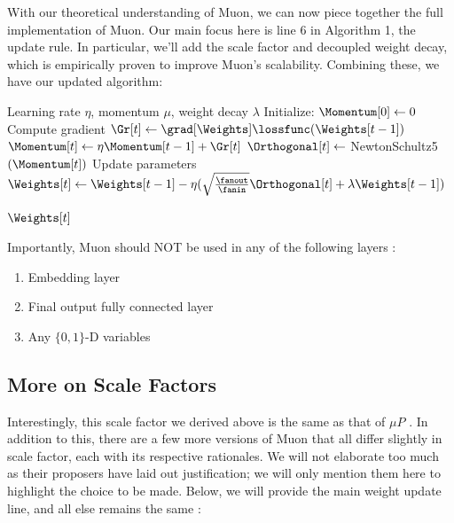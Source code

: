 \documentclass[12pt]{article}
\begin{document}
With our theoretical understanding of Muon, we can now piece together the full implementation of Muon. Our main focus here is line 6 in Algorithm 1, the update rule. In particular, we'll add the scale factor and decoupled weight decay, which is empirically proven to improve Muon's scalability\cite{liu2025muonscalablellmtraining}. Combining these, we have our updated algorithm:

\begin{algorithm}
\caption{Practical Muon Implementation}
\begin{algorithmic}[1]
    \Require Learning rate $\eta$, momentum $\mu$, weight decay $\lambda$
    \State Initialize: $\Momentum[0] \gets 0$
        \State Compute gradient $\Gr[t] \gets \grad[\Weights]\lossfunc(\Weights[t-1])$
        \State $\Momentum[t] \gets \eta \Momentum[t-1] + \Gr[t]$
        \State $\Orthogonal[t] \gets$ NewtonSchultz5$(\Momentum[t])$
        \State Update parameters $\Weights[t] \gets \Weights[t-1] - \eta(\sqrt{\frac{\fanout}{\fanin}}\Orthogonal[t] + \lambda \Weights[t-1])$
    \EndFor

    \State \Return $\Weights[t]$
\end{algorithmic}
\end{algorithm}

Importantly, Muon should NOT be used in any of the following layers \cite{chollet2015keras}:
\begin{enumerate}
    \item Embedding layer
    \item Final output fully connected layer
    \item Any $\{0,1\}$-D variables
\end{enumerate}

\subsection{More on Scale Factors}

Interestingly, this scale factor we derived above is the same as that of $\mu P$ \cite{yang2022tensorprogramsvtuning}. In addition to this, there are a few more versions of Muon that all differ slightly in scale factor, each with its respective rationales. We will not elaborate too much as their proposers have laid out justification; we will only mention them here to highlight the choice to be made. Below, we will provide the main weight update line, and all else remains the same \cite{kexuefm-11416} :
\end{document}
